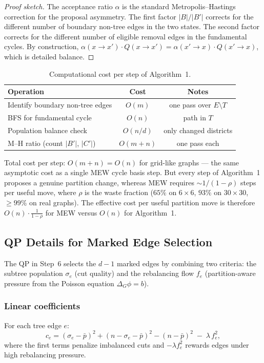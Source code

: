 \documentclass[11pt]{article}
\newcommand{\pbar}{\bar{p}}
\begin{document}
\begin{proof}[Proof sketch]
The acceptance ratio $\alpha$ is the standard Metropolis--Hastings correction
for the proposal asymmetry. The first factor $|B|/|B'|$ corrects for the
different number of boundary non-tree edges in the two states. The second factor
corrects for the different number of eligible removal edges in the fundamental
cycles. By construction, $\alpha(x \to x') \cdot Q(x \to x') = \alpha(x' \to x)
\cdot Q(x' \to x)$, which is detailed balance.
\end{proof}


\begin{table}[H]
\centering
\begin{tabular}{lcc}
\toprule
Operation & Cost & Notes \\
\midrule
Identify boundary non-tree edges & $O(m)$ & one pass over $E \setminus T$ \\
BFS for fundamental cycle & $O(n)$ & path in $T$ \\
Population balance check & $O(n/d)$ & only changed districts \\
M--H ratio (count $|B'|$, $|C'|$) & $O(m + n)$ & one pass each \\
\bottomrule
\end{tabular}
\caption{Computational cost per step of Algorithm~1.}\label{tab:cost}
\end{table}

\noindent Total cost per step: $O(m + n) = O(n)$ for grid-like graphs --- the
same asymptotic cost as a single MEW cycle basis step. But every step of
Algorithm~1 proposes a genuine partition change, whereas MEW requires
$\sim 1/(1 - \rho)$ steps per useful move, where $\rho$ is the waste fraction
($65\%$ on $6 \times 6$, $93\%$ on $30 \times 30$, $\geq 99\%$ on real graphs).
The effective cost per useful partition move is therefore $O(n) \cdot \frac{1}{1-\rho}$
for MEW versus $O(n)$ for Algorithm~1.


\subsection{QP Details for Marked Edge Selection}\label{sec:qp}

The QP in Step~6 selects the $d - 1$ marked edges by combining two criteria:
the subtree population $\sigma_e$ (cut quality) and the rebalancing flow $f_e$
(partition-aware pressure from the Poisson equation $\Delta_G \phi = b$).

\subsubsection*{Linear coefficients}
For each tree edge $e$:
\[
  c_e = (\sigma_e - \pbar)^2 + (n - \sigma_e - \pbar)^2 - (n - \pbar)^2
  \;-\; \lambda\, f_e^2,
\]
where the first terms penalize imbalanced cuts and $-\lambda f_e^2$ rewards
edges under high rebalancing pressure.
\end{document}
